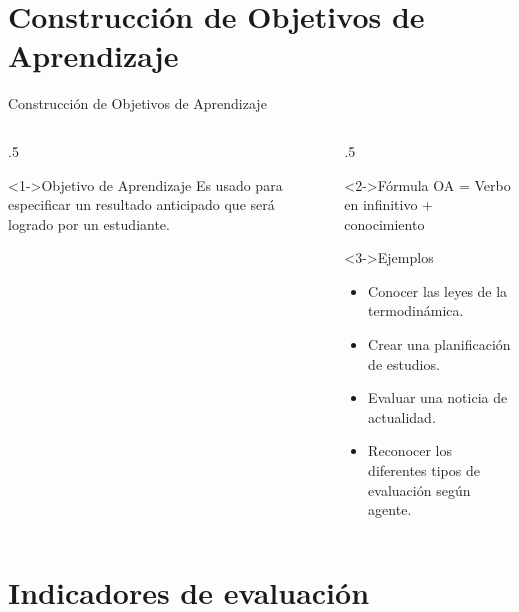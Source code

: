 \documentclass[11pt, aspectratio=169, xcolor=table,hyphens]{beamer}
\begin{document}
\section{Construcción de Objetivos de Aprendizaje}

\begin{frame}{Construcción de Objetivos de Aprendizaje}
	\begin{columns}
		\begin{column}{.5\linewidth}
			\begin{block}<1->{Objetivo de Aprendizaje}
				Es usado para especificar un resultado anticipado que será logrado por un estudiante.
			\end{block}
		\end{column}
		\begin{column}{.5\linewidth}
			\begin{block}<2->{Fórmula}
				OA = {\color{red}Verbo en infinitivo} + {\color{blue}conocimiento}
			\end{block}
			\begin{exampleblock}<3->{Ejemplos}
				\begin{itemize}
					\item[OA1]<3-> {\color{red}Conocer} las {\color{blue}leyes de la termodinámica.}
					\item[OA2]<4-> {\color{red}Crear} una {\color{blue}planificación de estudios}.
					\item[OA3]<5-> {\color{red}Evaluar} una {\color{blue}noticia de actualidad}.
					\item[OA4]<6-> {\color{red}Reconocer} los diferentes {\color{blue}tipos de evaluación según agente}.
				\end{itemize}
			\end{exampleblock}
		\end{column}
	\end{columns}
\end{frame}

\section{Indicadores de evaluación}
\end{document}
